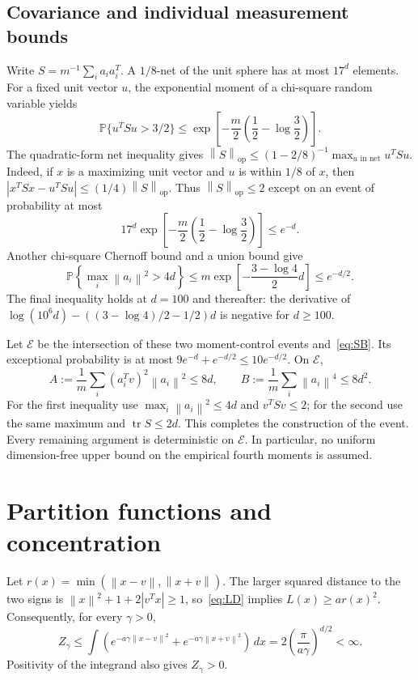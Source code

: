 \documentclass[11pt,letterpaper]{article}
\numberwithin{equation}{section}
\theoremstyle{remark}
\newcommand{\Prb}{\mathbb P}
\newcommand{\op}{\mathrm{op}}
\newcommand{\1}{\mathbf 1}
\newcommand{\norm}[1]{\left\lVert#1\right\rVert}
\newcommand{\abs}[1]{\left\lvert#1\right\rvert}
\begin{document}
\subsection{Covariance and individual measurement bounds}

Write $S=m^{-1}\sum_i a_ia_i^T$. A $1/8$-net of the unit sphere has at most $17^d$ elements. For a fixed unit vector $u$, the exponential moment of a chi-square random variable yields
\[
 \Prb\{u^TSu>3/2\}
 \le\exp\left[-\frac m2\left(\frac12-\log\frac32\right)\right].
\]
The quadratic-form net inequality gives
$\norm S_\op\le(1-2/8)^{-1}\max_{u\text{ in net}}u^TSu$.
Indeed, if $x$ is a maximizing unit vector and $u$ is within $1/8$ of $x$, then
$\abs{x^TSx-u^TSu}\le(1/4)\norm S_\op$.
Thus $\norm S_\op\le2$ except on an event of probability at most
\[
 17^d\exp\left[-\frac m2\left(\frac12-\log\frac32\right)\right]
 \le e^{-d}.
\]
Another chi-square Chernoff bound and a union bound give
\begin{equation}\label{eq:maxnorm}
 \Prb\left\{\max_i\norm{a_i}^2>4d\right\}
 \le m\exp\left[-\frac{3-\log4}{2}d\right]\le e^{-d/2}.
\end{equation}
The final inequality holds at $d=100$ and thereafter: the derivative of
$\log(10^6d)-((3-\log4)/2-1/2)d$ is negative for $d\ge100$.

Let $\mathcal E$ be the intersection of these two moment-control events and~\eqref{eq:SB}. Its exceptional probability is at most
$9e^{-d}+e^{-d/2}\le10e^{-d/2}$. On $\mathcal E$,
\begin{equation}\label{eq:AB}
 A:=\frac1m\sum_i(a_i^Tv)^2\norm{a_i}^2\le8d,
 \qquad
 B:=\frac1m\sum_i\norm{a_i}^4\le8d^2.
\end{equation}
For the first inequality use $\max_i\norm{a_i}^2\le4d$ and $v^TSv\le2$; for the second use the same maximum and $\operatorname{tr}S\le2d$. This completes the construction of the event. Every remaining argument is deterministic on $\mathcal E$. In particular, no uniform dimension-free upper bound on the empirical fourth moments is assumed.

\section{Partition functions and concentration}\label{sec:partition}

Let $r(x)=\min(\norm{x-v},\norm{x+v})$. The larger squared distance to the two signs is
$\norm x^2+1+2\abs{v^Tx}\ge1$, so~\eqref{eq:LD} implies $L(x)\ge ar(x)^2$. Consequently, for every $\gamma>0$,
\begin{equation}\label{eq:Zupper}
 Z_\gamma\le\int\left(e^{-a\gamma\norm{x-v}^2}
                       +e^{-a\gamma\norm{x+v}^2}\right)\,dx
 =2\left(\frac\pi{a\gamma}\right)^{d/2}<\infty.
\end{equation}
Positivity of the integrand also gives $Z_\gamma>0$.
\end{document}
